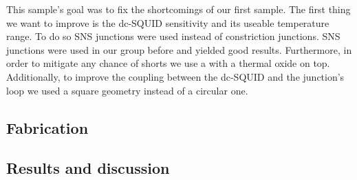 This sample's goal was to fix the shortcomings of our first sample. The first thing we want to improve is the dc-SQUID sensitivity and its useable temperature range. To do so SNS junctions were used instead of constriction junctions. SNS junctions were used in our group before and yielded good results.\cite{rogSQUIDontipMagneticMicroscopy2022} Furthermore, in order to mitigate any chance of shorts we use a  with a thermal oxide on top. Additionally, to improve the coupling between the dc-SQUID and the junction's loop we used a square geometry instead of a circular one. 

\subsection{Fabrication}
\label{sec:CP2.6B-fabrication}


\subsection{Results and discussion}

